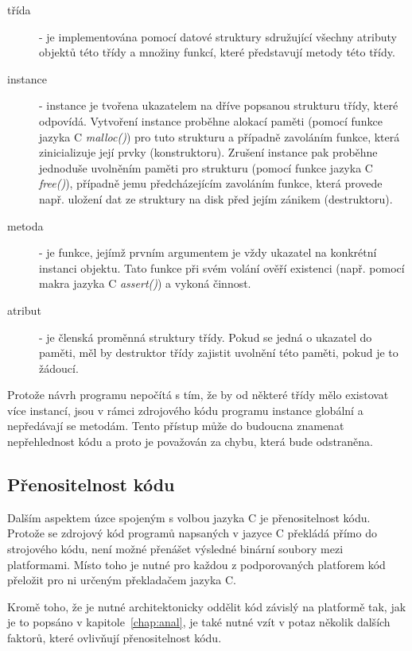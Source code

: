 \begin{description}
\item[třída] - je implementována pomocí datové struktury sdružující všechny
	atributy objektů této třídy a množiny funkcí, které představují
	metody této třídy.

\item[instance] - instance je tvořena ukazatelem na dříve popsanou strukturu
	třídy, které odpovídá. Vytvoření instance proběhne alokací paměti (pomocí
	funkce jazyka C {\em malloc()}) pro tuto strukturu a případně zavoláním
	funkce, která zinicializuje její prvky (konstruktoru). Zrušení instance pak
	proběhne jednoduše uvolněním paměti pro strukturu (pomocí funkce jazyka C
	{\em free()}), případně jemu předcházejícím zavoláním funkce, která provede
	např. uložení dat ze struktury na disk před jejím zánikem (destruktoru).

\item[metoda] - je funkce, jejímž prvním argumentem je vždy ukazatel na konkrétní
	instanci objektu. Tato funkce při svém volání ověří existenci (např. pomocí
	makra jazyka C {\em assert()}) a vykoná činnost.

\item[atribut] - je členská proměnná struktury třídy. Pokud se jedná o ukazatel
	do paměti, měl by destruktor třídy zajistit uvolnění této paměti, pokud je
	to žádoucí.
\end{description}


Protože návrh programu nepočítá s tím, že by od některé třídy mělo existovat
více instancí, jsou v rámci zdrojového kódu programu instance globální a
nepředávají se metodám. Tento přístup může do budoucna znamenat nepřehlednost
kódu a proto je považován za chybu, která bude odstraněna.

%
%

\subsection{Přenositelnost kódu}

Dalším aspektem úzce spojeným s volbou jazyka C je přenositelnost kódu. Protože
se zdrojový kód programů napsaných v jazyce C překládá přímo do strojového
kódu, není možné přenášet výsledné binární soubory mezi platformami. Místo toho
je nutné pro každou z podporovaných platforem kód přeložit pro ni určeným
překladačem jazyka C.

Kromě toho, že je nutné architektonicky oddělit kód závislý na platformě tak,
jak je to popsáno v kapitole~\ref{chap:anal}, je také nutné vzít v potaz
několik dalších faktorů, které ovlivňují přenositelnost kódu.


